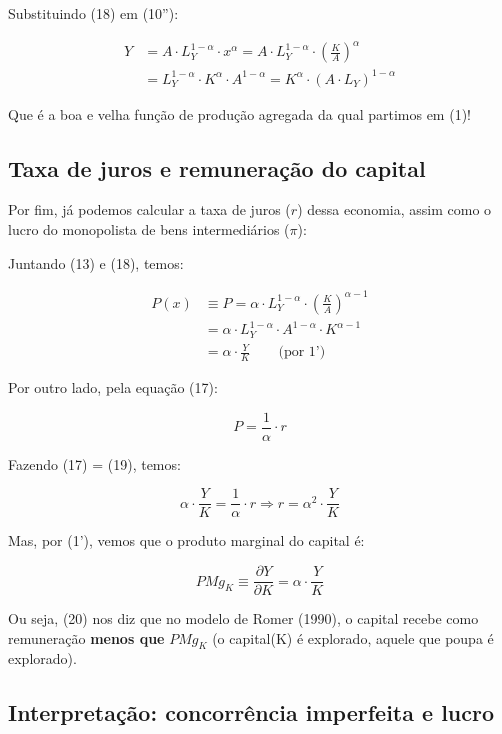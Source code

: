 \documentclass[a4paper,12pt]{article}[abntex2]
\begin{document}
Substituindo (18) em (10''):

\begin{align*}
Y &= A \cdot L_Y^{1 - \alpha} \cdot x^{\alpha}
= A \cdot L_Y^{1 - \alpha} \cdot \left( \frac{K}{A} \right)^{\alpha} \\
&= L_Y^{1 - \alpha} \cdot K^{\alpha} \cdot A^{1 - \alpha}
= K^{\alpha} \cdot (A \cdot L_Y)^{1 - \alpha} \tag{1'}
\end{align*}

\noindent Que é a boa e velha função de produção agregada da qual partimos em (1)!

\subsection{\textbf{Taxa de juros e remuneração do capital}}

Por fim, já podemos calcular a taxa de juros ($r$) dessa economia, assim como o lucro do monopolista de bens intermediários ($\pi$):

Juntando (13) e (18), temos:

\begin{align*}
P(x) &\equiv P = \alpha \cdot L_Y^{1 - \alpha} \cdot \left( \frac{K}{A} \right)^{\alpha - 1} \\
&= \alpha \cdot L_Y^{1 - \alpha} \cdot A^{1 - \alpha} \cdot K^{\alpha - 1} \\
&= \alpha \cdot \frac{Y}{K} \tag{19} \qquad \text{(por 1')}
\end{align*}

Por outro lado, pela equação (17):

\begin{equation}
P = \frac{1}{\alpha} \cdot r
\end{equation}

Fazendo (17) = (19), temos:

\[
\alpha \cdot \frac{Y}{K} = \frac{1}{\alpha} \cdot r 
\Rightarrow r = \alpha^2 \cdot \frac{Y}{K} \tag{20}
\]

Mas, por (1'), vemos que o produto marginal do capital é:

\[
PMg_K \equiv \frac{\partial Y}{\partial K} = \alpha \cdot \frac{Y}{K}
\]

Ou seja, (20) nos diz que no modelo de Romer (1990), o capital recebe como remuneração \textbf{menos que} $PMg_K$ (o capital(K) é explorado, aquele que poupa é explorado).

\subsection{\textbf{Interpretação: concorrência imperfeita e lucro}}
\end{document}
